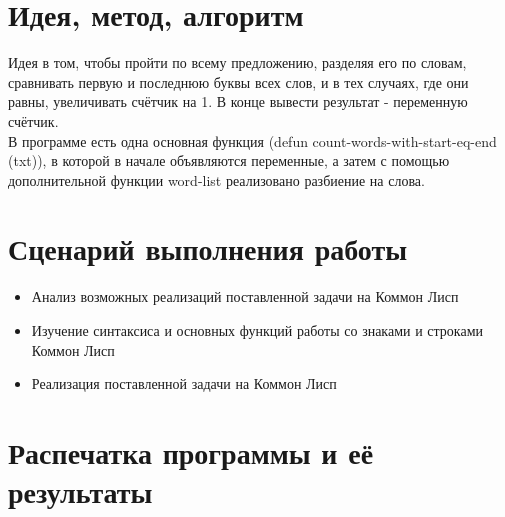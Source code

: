 \documentclass[12pt]{article}
\begin{document}
\section{Идея, метод, алгоритм}
Идея в том, чтобы пройти по всему предложению, разделяя его по словам, сравнивать первую и последнюю буквы всех слов, и в тех случаях, где они равны, увеличивать счётчик на 1. В конце вывести результат - переменную счётчик.
\\
В программе есть одна основная функция (defun count-words-with-start-eq-end (txt)), в которой в начале объявляются переменные, а затем с помощью дополнительной функции word-list реализовано разбиение на слова.

\section{Сценарий выполнения работы}
\begin{itemize}
\setlength{\itemsep}{-1mm}
\item Анализ возможных реализаций поставленной задачи на Коммон Лисп
\item Изучение синтаксиса и основных функций работы со знаками и строками Коммон Лисп
\item Реализация поставленной задачи на Коммон Лисп
\end{itemize}
\section{Распечатка программы и её результаты}
\end{document}
